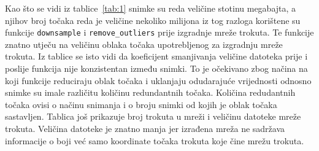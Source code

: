 Kao što se vidi iz tablice~\ref{tab:1} snimke su reda veličine stotinu
megabajta, a njihov broj točaka reda je veličine nekoliko milijona iz
tog razloga korištene su funkcije \texttt{downsample} i
\texttt{remove\_outliers} prije izgradnje mreže trokuta. Te funkcije
znatno utječu na veličinu oblaka točaka upotrebljenog za izgradnju mreže
trokuta. Iz tablice se isto vidi da koeficijent smanjivanja veličine
datoteka prije i poslije funkcija nije konzistentan između snimki. To je
očekivano zbog načina na koji funkcije reduciraju oblak točaka i
uklanjaju odudarajuće vrijednosti odnosno snimke su imale različitu
količinu redundantnih točaka. Količina redudantnih točaka ovisi o načinu
snimanja i o broju snimki od kojih je oblak točaka sastavljen.  Tablica
još prikazuje broj trokuta u mreži i veličinu datoteke mreže trokuta.
Veličina datoteke je znatno manja jer izrađena mreža ne sadržava
informacije o boji već samo koordinate točaka trokuta koje čine mrežu
trokuta.




